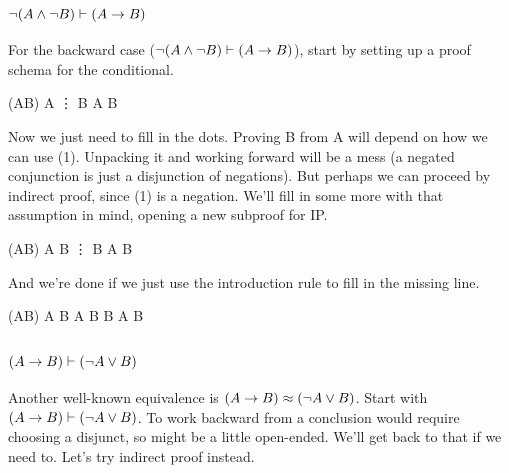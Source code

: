 \subsubsection{$\neg(A \wedge\neg B)\vdash(A \rightarrow B)$}

For the backward case ($\neg(A \wedge\neg B)\vdash(A \rightarrow B)$), start by
setting up a proof schema for the conditional.

\begin{fitchproof}
   {\enot(A\eand\enot B)} 
  \open
   {A}                    
   { \vdots }
   {B}
  \close
   {A \eif B}             
\end{fitchproof}      

Now we just need to fill in the dots. Proving B from A will depend on how we
can use (1). Unpacking it and working forward will be a mess (a negated
conjunction is just a disjunction of negations). But perhaps we can proceed by
indirect proof, since (1) is a negation. We'll fill in some more with that
assumption in mind, opening a new subproof for IP.

\begin{fitchproof}
   {\enot(A\eand\enot B)} 
  \open
   {A}                    
  \open
   {\enot B}              
   {\vdots}
   {\ebot}
  \close
   {B}
  \close
   {A \eif B}             
\end{fitchproof}      

And we're done if we just use the \eand introduction rule to fill in the missing
line.

\begin{fitchproof}
   {\enot(A\eand\enot B)} 
  \open
   {A}                    
  \open
   {\enot B}              
   {A \eand\enot B}       
   {\ebot}                
  \close
   {B}                    
  \close
   {A \eif B}             
\end{fitchproof}      

\subsubsection{$(A \rightarrow B)\vdash(\neg A \vee B)$}

Another well-known equivalence is $(A \rightarrow B)\approx(\neg A \vee B)$. Start
with $(A \rightarrow B)\vdash(\neg A \vee B)$. To work backward from a conclusion
would require choosing a disjunct, so might be a little open-ended. We'll get
back to that if we need to. Let's try indirect proof instead.

